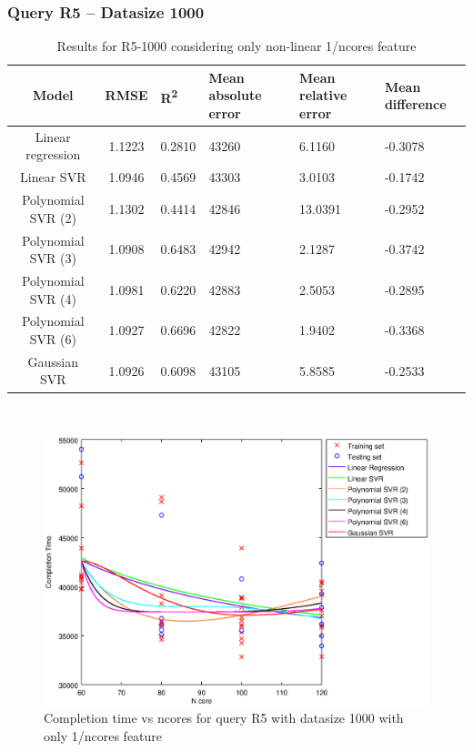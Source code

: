 \documentclass[a4paper,11pt]{article}
\begin{document}
\newpage
\subsubsection{Query R5 -- Datasize 1000}
\begin{table}[H]
	\centering
	\begin{adjustbox}{center}
		\begin{tabular}{c | c M{1.2cm} M{2.5cm} M{2.5cm} M{1.8cm}}
			Model & RMSE & R\textsuperscript{2} & Mean absolute error & Mean relative error & Mean difference \tabularnewline
			\hline
			Linear regression & 1.1223 & 0.2810 &  43260 & 6.1160 & -0.3078 \\
			Linear SVR & 1.0946 & 0.4569 &  43303 & 3.0103 & -0.1742 \\
			Polynomial SVR (2) & 1.1302 & 0.4414 &  42846 & 13.0391 & -0.2952 \\
			Polynomial SVR (3) & 1.0908 & 0.6483 &  42942 & 2.1287 & -0.3742 \\
			Polynomial SVR (4) & 1.0981 & 0.6220 &  42883 & 2.5053 & -0.2895 \\
			Polynomial SVR (6) & 1.0927 & 0.6696 &  42822 & 1.9402 & -0.3368 \\
			Gaussian SVR & 1.0926 & 0.6098 &  43105 & 5.8585 & -0.2533 \\
		\end{tabular}
	\end{adjustbox}
	\\
	\caption{Results for R5-1000 considering only non-linear 1/ncores feature}
	\label{table_R5_prediction_all}
\end{table}

\begin {figure}[hbtp]
\centering
\includegraphics[width=\textwidth]{output/R5_1000_ONLY_1_OVER_NCORES/plot_R5_1000.eps}
\caption {Completion time vs ncores for query R5 with datasize 1000 with only 1/ncores feature}
\end {figure}
\end{document}
